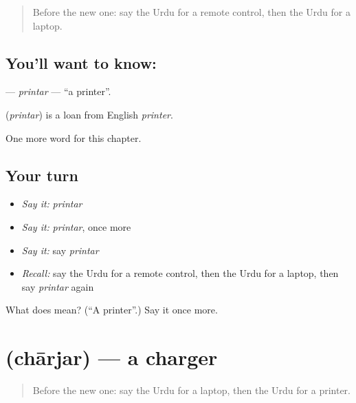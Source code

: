 \label{lesson:UR-C165-printar}



\begin{quote}
Before the new one: say the Urdu for a remote control, then the Urdu for a laptop.
\end{quote}

\subsection*{You'll want to know: }
\textbf{} — \emph{printar} — \textquotedblleft{}a printer\textquotedblright{}.

\begin{cousinweb}
\textbf{} (\emph{printar}) is a loan from English \emph{printer}.
\end{cousinweb}

\begin{grammarlens}[title={What you've built}]
One more word for this chapter.
\end{grammarlens}

\subsection*{Your turn}
\begin{itemize}
\raggedright
  \item \emph{Say it:} \emph{printar}
  \item \emph{Say it:} \emph{printar}, once more
  \item \emph{Say it:} say \emph{printar}
  \item \emph{Recall:} say the Urdu for a remote control, then the Urdu for a laptop, then say \emph{printar} again
\end{itemize}

\begin{tcolorbox}[breakable,colback=teal!4,colframe=teal!35!black,title={Before you move on}]
What does  mean? (\textquotedblleft{}A printer\textquotedblright{}.) Say it once more.
\end{tcolorbox}
\section[\texorpdfstring{\ur{چارجر} (chārjar)}{چارجر (chārjar)}]{ (chārjar) — a charger}

\label{lesson:UR-C165-charjar}



\begin{quote}
Before the new one: say the Urdu for a laptop, then the Urdu for a printer.
\end{quote}

